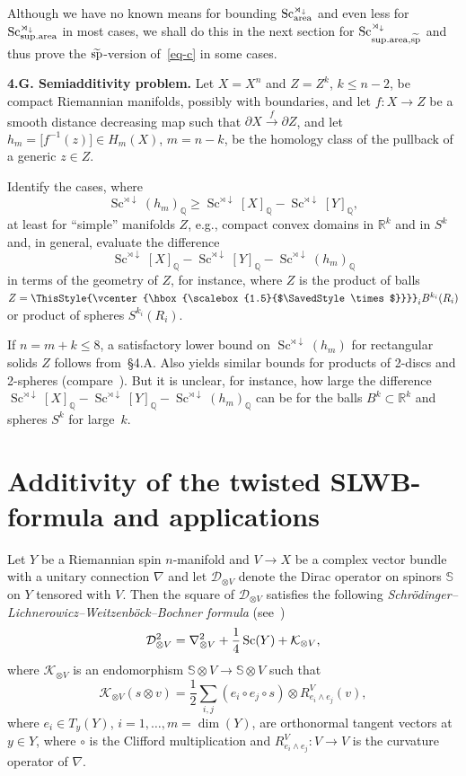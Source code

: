 \documentclass[pdftex]{sigma}
\numberwithin{equation}{section}
\newcommand\bigtimes{\mathbin{\ThisStyle{\vcenter{\hbox{%
\scalebox{1.5}{$\SavedStyle\times$}}}}}}
\begin{document}
Although we have no known means for bounding $\operatorname{Sc}_{\rm area}^{\rtimes_\downarrow}$ and even less for $\operatorname{Sc}_{{\rm sup.area}}^{\rtimes_\downarrow}$ in most cases, we shall
do this in the next section for $\operatorname{Sc}_{{\rm sup.area}, \widetilde{\rm sp}}^{\rtimes_\downarrow}$ and thus prove
the $\widetilde{\rm sp}$-version of~\eqref{eq-c}
in some cases.

\textbf{4.G. Semiadditivity problem.} Let $ X=X^n$ and $Z=Z^k$, $k\leq n-2$, be compact Riemannian manifolds, possibly with boundaries,
and let $f\colon X\to Z$ be a smooth distance decreasing map such that $\partial X\overset {f}\to\partial Z$,
and let $h_m=\bigl[f^{-1}(z)\bigr]\in H_m(X)$, $m=n-k$, be the homology class of the pullback of a generic $z\in Z$.

Identify the cases, where
\[
\operatorname{Sc}^{\rtimes\downarrow}(h_m)_{\mathbb Q}\geq \operatorname{Sc}^{\rtimes\downarrow}[X]_{\mathbb Q} - \operatorname{Sc}^{\rtimes\downarrow}[Y]_{\mathbb Q} ,
\]
at least for ``simple'' manifolds $Z$, e.g.,
compact convex domains in $\mathbb R^k$ and in $S^k$ and, in general,
evaluate the difference
\[
\operatorname{Sc}^{\rtimes\downarrow}[X]_{\mathbb Q} -\operatorname{Sc}^{\rtimes\downarrow}[Y]_{\mathbb Q} -\operatorname{Sc}^{\rtimes\downarrow}(h_m)_{\mathbb Q}
\]
in terms of the geometry of $Z$, for instance, where $Z$ is the product of balls $Z=\bigtimes_iB^{k_i}(R_i)$ or product of spheres $S^{k_i}(R_i)$.

If $n=m+k\leq 8$, a satisfactory lower bound on $\operatorname{Sc}^{\rtimes\downarrow}(h_m)$
 for rectangular solids $Z$ follows from~\S4.A.
 Also \cite[\S2.B]{Gr2023} yields similar bounds for products of 2-discs and 2-spheres
(compare~\cite{GZ2021}). But it is unclear, for instance, how large the difference $\operatorname{Sc}^{\rtimes\downarrow}[X]_{\mathbb Q} -\operatorname{Sc}^{\rtimes\downarrow}[Y]_{\mathbb Q} -\operatorname{Sc}^{\rtimes\downarrow}(h_m)_{\mathbb Q}$
can be for the balls $B^k\subset \mathbb R^k$ and spheres $S^k$ for large~$k$.

\section{Additivity of the twisted SLWB-formula and applications}\label{section5}

Let $Y$ be a Riemannian spin $n$-manifold and $V\to X$ be a complex vector bundle with a unitary connection $\nabla$ and let $\mathcal D_{\otimes V}$ denote
the Dirac operator on spinors $\mathbb S$ on $Y$ tensored with $V$. Then the square of $\mathcal D_{\otimes V}$ satisfies the following
 {\it Schr\"odinger--Lichnerowicz--Weitzenb\"ock--Bochner formula} (see~\cite{LM1989})
\[
{\cal D}_{\otimes V}^2=\nabla^2_{\otimes V} + \frac{1}{4}\operatorname{Sc}(Y) + {\cal K}_{\otimes V},
\]
where $\mathcal K_{\otimes V}$ is an endomorphism
$\mathbb S\otimes V\to \mathbb S\otimes V $ such that
\[
\mathcal K_{\otimes V}(s\otimes v)=\frac {1}{2}\sum_{i,j}(e_i\circ e_j\circ s) \otimes R^V_{e_i\wedge e_j}(v),
\]
where $e_i\in T_y(Y) $, $i=1,\dots,m=\dim(Y)$, are orthonormal tangent vectors at $y\in Y$, where
 $\circ$ is the Clifford multiplication and $R^V_{e_i\wedge e_j}\colon V\to V$ is the curvature operator of $\nabla$.
\end{document}
